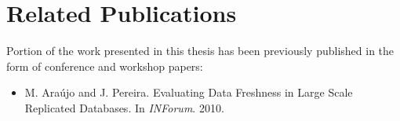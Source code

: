 \section{Related Publications}

Portion of the work presented in this thesis has been previously published in the form of conference and workshop papers:

\begin{itemize}
	\item M. Araújo and J. Pereira. Evaluating Data Freshness in Large Scale Replicated Databases. In \textit{INForum}. 2010.
\end{itemize}



